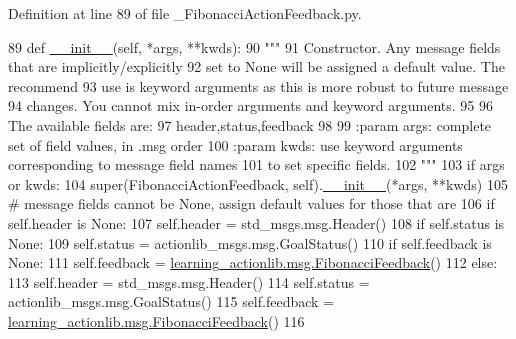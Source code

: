 Definition at line 89 of file \+\_\+\+Fibonacci\+Action\+Feedback.\+py.


\begin{DoxyCode}
89   \textcolor{keyword}{def }\hyperlink{classstate__machine_1_1Play_a5993a23d8be7f7b2647f71ede0334957}{\_\_init\_\_}(self, *args, **kwds):
90     \textcolor{stringliteral}{"""}
91 \textcolor{stringliteral}{    Constructor. Any message fields that are implicitly/explicitly}
92 \textcolor{stringliteral}{    set to None will be assigned a default value. The recommend}
93 \textcolor{stringliteral}{    use is keyword arguments as this is more robust to future message}
94 \textcolor{stringliteral}{    changes.  You cannot mix in-order arguments and keyword arguments.}
95 \textcolor{stringliteral}{}
96 \textcolor{stringliteral}{    The available fields are:}
97 \textcolor{stringliteral}{       header,status,feedback}
98 \textcolor{stringliteral}{}
99 \textcolor{stringliteral}{    :param args: complete set of field values, in .msg order}
100 \textcolor{stringliteral}{    :param kwds: use keyword arguments corresponding to message field names}
101 \textcolor{stringliteral}{    to set specific fields.}
102 \textcolor{stringliteral}{    """}
103     \textcolor{keywordflow}{if} args \textcolor{keywordflow}{or} kwds:
104       super(FibonacciActionFeedback, self).\hyperlink{classstate__machine_1_1Play_a5993a23d8be7f7b2647f71ede0334957}{\_\_init\_\_}(*args, **kwds)
105       \textcolor{comment}{# message fields cannot be None, assign default values for those that are}
106       \textcolor{keywordflow}{if} self.header \textcolor{keywordflow}{is} \textcolor{keywordtype}{None}:
107         self.header = std\_msgs.msg.Header()
108       \textcolor{keywordflow}{if} self.status \textcolor{keywordflow}{is} \textcolor{keywordtype}{None}:
109         self.status = actionlib\_msgs.msg.GoalStatus()
110       \textcolor{keywordflow}{if} self.feedback \textcolor{keywordflow}{is} \textcolor{keywordtype}{None}:
111         self.feedback = \hyperlink{classlearning__actionlib_1_1msg_1_1__FibonacciFeedback_1_1FibonacciFeedback}{learning\_actionlib.msg.FibonacciFeedback}()
112     \textcolor{keywordflow}{else}:
113       self.header = std\_msgs.msg.Header()
114       self.status = actionlib\_msgs.msg.GoalStatus()
115       self.feedback = \hyperlink{classlearning__actionlib_1_1msg_1_1__FibonacciFeedback_1_1FibonacciFeedback}{learning\_actionlib.msg.FibonacciFeedback}()
116 
\end{DoxyCode}


